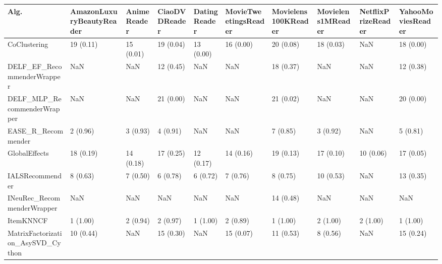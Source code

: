 \begin{tabular}{llllllllll}
\toprule
                               Alg. & AmazonLuxuryBeautyReader & AnimeReader & CiaoDVDReader & DatingReader & MovieTweetingsReader & Movielens100KReader & Movielens1MReader & NetflixPrizeReader & YahooMoviesReader \\
\midrule
                       CoClustering &                19 (0.11) &   15 (0.01) &     19 (0.04) &    13 (0.00) &            16 (0.00) &           20 (0.08) &         18 (0.03) &                NaN &         18 (0.00) \\
         DELF\_EF\_RecommenderWrapper &                      NaN &         NaN &     12 (0.45) &          NaN &                  NaN &           18 (0.37) &               NaN &                NaN &         12 (0.38) \\
        DELF\_MLP\_RecommenderWrapper &                      NaN &         NaN &     21 (0.00) &          NaN &                  NaN &           21 (0.02) &               NaN &                NaN &         20 (0.00) \\
                 EASE\_R\_Recommender &                 2 (0.96) &    3 (0.93) &      4 (0.91) &          NaN &                  NaN &            7 (0.85) &          3 (0.92) &                NaN &          5 (0.81) \\
                      GlobalEffects &                18 (0.19) &   14 (0.18) &     17 (0.25) &    12 (0.17) &            14 (0.16) &           19 (0.13) &         17 (0.10) &          10 (0.06) &         17 (0.05) \\
                    IALSRecommender &                 8 (0.63) &    7 (0.50) &      6 (0.78) &     6 (0.72) &             7 (0.76) &            8 (0.75) &         10 (0.53) &                NaN &         13 (0.35) \\
         INeuRec\_RecommenderWrapper &                      NaN &         NaN &           NaN &          NaN &                  NaN &           14 (0.48) &               NaN &                NaN &               NaN \\
                          ItemKNNCF &                 1 (1.00) &    2 (0.94) &      2 (0.97) &     1 (1.00) &             2 (0.89) &            1 (1.00) &          2 (1.00) &           2 (1.00) &          1 (1.00) \\
  MatrixFactorization\_AsySVD\_Cython &                10 (0.44) &         NaN &     15 (0.30) &          NaN &            15 (0.07) &           11 (0.53) &          8 (0.56) &                NaN &         15 (0.24) \\

\end{tabular}
